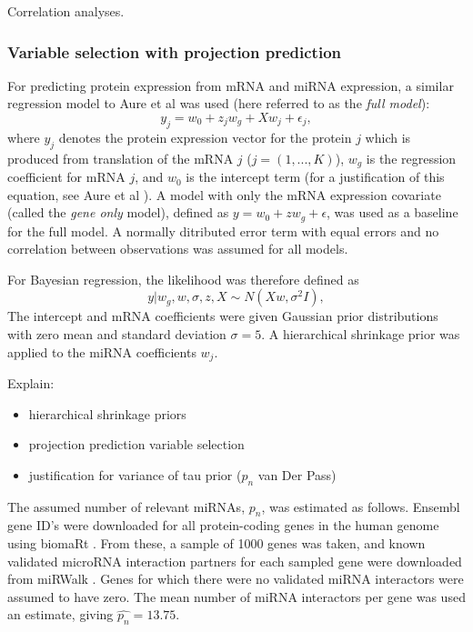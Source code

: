 Correlation analyses.


\subsubsection{Variable selection with projection prediction}\label{sec:PPVS}

For predicting protein expression from mRNA and miRNA expression, a similar
regression model to Aure et al was used (here referred to as the \emph{full
model}):
\begin{equation}
	y_j = w_0 + z_j w_g + X w_j + \epsilon_j,
\end{equation}
where $y_j$ denotes the protein expression vector for the protein $j$ which
is produced from translation of the mRNA $j$ ($j = (1, ..., K)$), $w_g$
is the regression coefficient for mRNA $j$, and $w_0$ is the intercept term
(for a justification of this equation, see Aure et al \citep{Aure2015}).
A model with only the mRNA expression covariate (called the \emph{gene only} model),
defined as $y = w_0 + z w_g + \epsilon$, was used as a baseline for the full model.
A normally ditributed error term with equal errors and no correlation
between observations was assumed for all models.

For Bayesian regression, the likelihood was therefore defined as
\begin{equation}
	y | w_g, w, \sigma, z, X \sim N(Xw, \sigma^2I),
\end{equation}
The intercept and mRNA coefficients were given Gaussian prior
distributions with zero mean and standard deviation $\sigma=5$.
A hierarchical shrinkage prior was applied to the miRNA coefficients
$w_j$.

Explain:
\begin{itemize}
  \item hierarchical shrinkage priors
  \item projection prediction variable selection
  \item justification for variance of tau prior ($p_n$ van Der Pass)
\end{itemize}

The assumed number of relevant miRNAs, $p_n$, was estimated as follows.
Ensembl gene ID's were downloaded for all protein-coding genes in the human
genome using biomaRt \citep{biomaRt}. From these, a sample of 1000 genes was
taken, and known validated microRNA interaction partners for each sampled gene
were downloaded from miRWalk \citep{Dweep2015}. Genes for which there were no
validated miRNA interactors were assumed to have zero. The mean number of
miRNA interactors per gene was used an estimate, giving
$\hat{p_n} = 13.75$.

